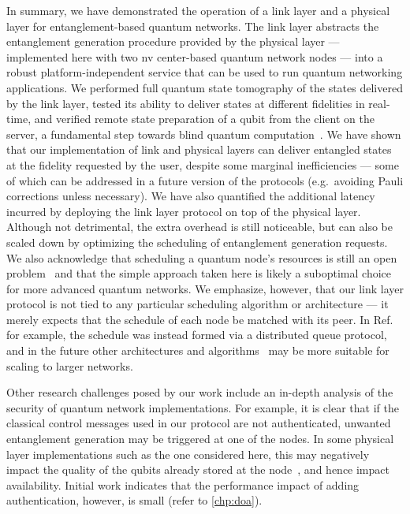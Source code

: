 In summary, we have demonstrated the operation of a link layer and a physical layer for
entanglement-based quantum networks. The link layer abstracts the entanglement generation procedure
provided by the physical layer --- implemented here with two \acrshort{nv} center-based quantum
network nodes --- into a robust platform-independent service that can be used to run quantum
networking applications. We performed full quantum state tomography of the states delivered by the
link layer, tested its ability to deliver states at different fidelities in real-time, and verified
remote state preparation of a qubit from the client on the server, a fundamental step towards blind
quantum computation~\cite{broadbent_2009_ubqc}. We have shown that our implementation of link and
physical layers can deliver entangled states at the fidelity requested by the user, despite some
marginal inefficiencies --- some of which can be addressed in a future version of the protocols
(e.g.~avoiding Pauli corrections unless necessary). We have also quantified the additional latency
incurred by deploying the link layer protocol on top of the physical layer. Although not
detrimental, the extra overhead is still noticeable, but can also be scaled down by optimizing the
scheduling of entanglement generation requests. We also acknowledge that scheduling a quantum node's
resources is still an open problem~\cite{skrzypczyk_2021_arch, vardoyan_2019_performance,
vardoyan_2021_capacity} and that the simple approach taken here is likely a suboptimal choice for
more advanced quantum networks. We emphasize, however, that our link layer protocol is not tied to
any particular scheduling algorithm or architecture --- it merely expects that the schedule of each
node be matched with its peer. In Ref.~\cite{dahlberg_2019_egp} for example, the schedule was
instead formed via a distributed queue protocol, and in the future other architectures and
algorithms~\cite{skrzypczyk_2021_arch} may be more suitable for scaling to larger networks.

Other research challenges posed by our work include an in-depth analysis of the security of quantum
network implementations. For example, it is clear that if the classical control messages used in our
protocol are not authenticated, unwanted entanglement generation may be triggered at one of the
nodes. In some physical layer implementations such as the one considered here, this may negatively
impact the quality of the qubits already stored at the node~\cite{kalb_2018_dephasing}, and hence
impact availability. Initial work indicates that the performance impact of adding authentication,
however, is small (refer to \cref{chp:doa}).

